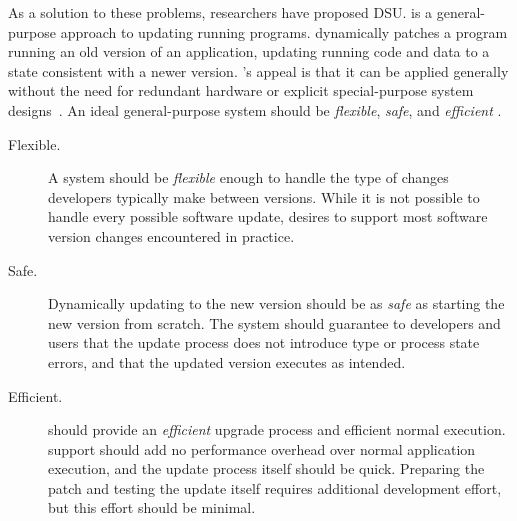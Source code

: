 As a solution to these problems, researchers have proposed \acf{DSU}.  \USD is a
general-purpose approach to updating running programs. \USD dynamically patches a program running an old version of an
application, updating running code and data to a state consistent with a
newer version.  \USD's appeal is that it can be applied generally without
the need for redundant hardware or explicit special-purpose system designs~\cite{kspliceslashdot08}. An ideal general-purpose \USD system
should be \emph{flexible}, \emph{safe}, and \emph{efficient}
\cite{hicks-thesis, neamtiu-thesis}.
%
\begin{description}
%
\item[Flexible.] A \USD system should be \emph{flexible} enough to handle the type of
changes developers typically make between versions. While it is not
possible to handle every possible software update, \USD desires to support most
software version changes encountered in practice.
%
\item[Safe.] Dynamically updating to the new version should be as {\em safe}
as starting the new version from scratch. The system should guarantee to
developers and users that the update process does not introduce type or
process state errors, and that the updated version executes as intended.
%
\item[Efficient.] \USD should provide an \emph{efficient} upgrade process and efficient
normal execution.  \USD support should add no performance overhead over
normal application execution, and the update process itself should be
quick. Preparing the patch and testing the update itself requires
additional development effort, but this effort should be minimal.
%
\end{description}

